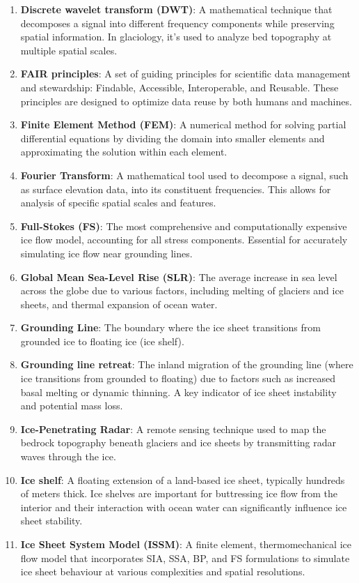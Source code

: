 \begin{enumerate}
\item \textbf{Discrete wavelet transform (DWT)}: A mathematical technique that decomposes a signal into different frequency components while preserving spatial information. In glaciology, it's used to analyze bed topography at multiple spatial scales.
\item \textbf{FAIR principles}: A set of guiding principles for scientific data management and stewardship: Findable, Accessible, Interoperable, and Reusable. These principles are designed to optimize data reuse by both humans and machines.
\item \textbf{Finite Element Method (FEM)}: A numerical method for solving partial differential equations by dividing the domain into smaller elements and approximating the solution within each element.
\item \textbf{Fourier Transform}: A mathematical tool used to decompose a signal, such as surface elevation data, into its constituent frequencies. This allows for analysis of specific spatial scales and features.
\item \textbf{Full-Stokes (FS)}: The most comprehensive and computationally expensive ice flow model, accounting for all stress components. Essential for accurately simulating ice flow near grounding lines.
\item \textbf{Global Mean Sea-Level Rise (SLR)}: The average increase in sea level across the globe due to various factors, including melting of glaciers and ice sheets, and thermal expansion of ocean water.
\item \textbf{Grounding Line}: The boundary where the ice sheet transitions from grounded ice to floating ice (ice shelf).
\item \textbf{Grounding line retreat}: The inland migration of the grounding line (where ice transitions from grounded to floating) due to factors such as increased basal melting or dynamic thinning. A key indicator of ice sheet instability and potential mass loss.
\item \textbf{Ice-Penetrating Radar}: A remote sensing technique used to map the bedrock topography beneath glaciers and ice sheets by transmitting radar waves through the ice.
\item \textbf{Ice shelf}: A floating extension of a land-based ice sheet, typically hundreds of meters thick. Ice shelves are important for buttressing ice flow from the interior and their interaction with ocean water can significantly influence ice sheet stability.
\item \textbf{Ice Sheet System Model (ISSM)}: A finite element, thermomechanical ice flow model that incorporates SIA, SSA, BP, and FS formulations to simulate ice sheet behaviour at various complexities and spatial resolutions.

\end{enumerate}
